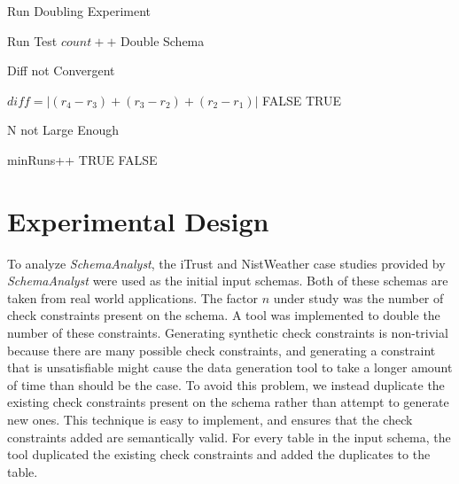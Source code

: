 \documentclass[smallextended]{svjour3}       %
\begin{document}
\begin{algorithm}[t]
    \caption{Run Doubling Experiment}
    \begin{algorithmic}
        \STATE Run Test
        \STATE $\mathit{count}++$
        \ENDFOR
        \STATE Double Schema
        \ENDWHILE
    \end{algorithmic}
    \label{alg:main}
  \end{algorithm}

 \begin{algorithm}[t]
    \caption{Diff not Convergent}
    \begin{algorithmic}
      \STATE $\mathit{diff} = |(r_4 - r_3) + (r_3 -r_2) + (r_2 - r_1)|$
      \RETURN FALSE
      \ELSE
      \RETURN TRUE
      \ENDIF
    \end{algorithmic}
    \label{alg:convergence}
  \end{algorithm}

 \begin{algorithm}[t]
    \caption{N not Large Enough}
    \begin{algorithmic}
      \STATE minRuns++
      \RETURN TRUE
      \ENDIF
      \ENDIF
      \RETURN FALSE
    \end{algorithmic}
    \label{alg:tuning}
  \end{algorithm}

\section{Experimental Design}
To analyze \textit{SchemaAnalyst}, the iTrust and NistWeather case
studies provided by \textit{SchemaAnalyst} were used as the initial 
input schemas.
Both of these schemas are taken from real world applications. The factor $n$
under study was the number of check constraints present on the schema.  A tool was
implemented to double the number of these constraints. Generating
synthetic check constraints is non-trivial because there are many
possible check constraints, and generating a constraint that is
unsatisfiable might cause the data generation tool to take a longer
amount of time than should be the case. To avoid this problem, we
instead duplicate the existing check constraints present on the schema
rather than attempt to generate new ones. This technique is easy
to implement, and ensures that the check constraints added are
semantically valid.  For every table in the input schema, the tool 
duplicated the existing check constraints and added the duplicates 
to the table.  
\end{document}
